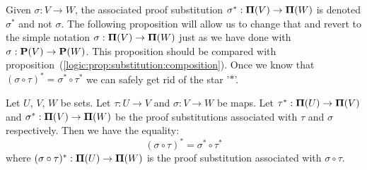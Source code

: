 Given $\sigma:V\to W$, the associated proof substitution
$\sigma^{*}:\mbox{${\bf\Pi}(V)$}\to{\bf\Pi}(W)$ is denoted $\sigma^{*}$ and not
$\sigma$. The following proposition will allow us to change that and
revert to the simple notation $\sigma:\mbox{${\bf\Pi}(V)$}\to{\bf\Pi}(W)$ just as we
have done with $\sigma:\mbox{${\bf P}(V)$}\to{\bf P}(W)$. This proposition should be
compared with
proposition~(\ref{logic:prop:substitution:composition}). Once we
know that $(\sigma\circ\tau)^{*}=\sigma^{*}\circ\tau^{*}$ we can
safely get rid of the star '$*$'.

\begin{prop}\label{logic:prop:FUAP:substitution:composition}
Let $U$, $V$, $W$ be sets. Let $\tau:U\to V$ and $\sigma:V\to W$ be
maps. Let $\tau^{*}:{\bf\Pi}(U)\to\mbox{${\bf\Pi}(V)$}$ and
$\sigma^{*}:\mbox{${\bf\Pi}(V)$}\to{\bf\Pi}(W)$ be the proof substitutions
associated with $\tau$ and $\sigma$ respectively. Then we have the
equality:
    \[
    (\sigma\circ\tau)^{*}=\sigma^{*}\circ\tau^{*}
    \]
where $(\sigma\circ\tau)^{*}:{\bf\Pi}(U)\to {\bf\Pi}(W)$ is the
proof substitution associated with $\sigma\circ\tau$.
\end{prop}
